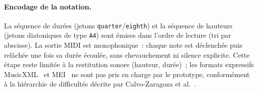 \documentclass[a4paper,10pt]{article}
\begin{document}
\paragraph{Encodage de la notation.}
La séquence de durées (jetons \texttt{quarter}/\texttt{eighth}) et la séquence de hauteurs (jetons diatoniques de type \texttt{A4}) sont émises dans l'ordre de lecture (tri par abscisse). La sortie MIDI est monophonique~: chaque note est déclenchée puis relâchée une fois sa durée écoulée, sans chevauchement ni silence explicite. Cette étape reste limitée à la restitution sonore (hauteur, durée)~; les formats expressifs MusicXML~\cite{good2001} et MEI~\cite{roland2002} ne sont pas pris en charge par le prototype, conformément à la hiérarchie de difficultés décrite par Calvo-Zaragoza et al.~\cite{calvozaragoza2020understanding}.

\newpage



\end{document}
